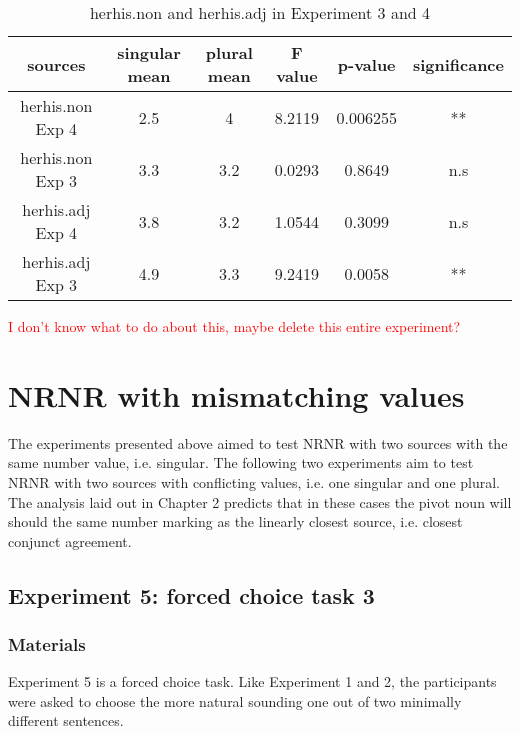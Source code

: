 \documentclass[
  11pt          %
  ,letterpaper  %
  ,center       %
  ,noupper      %
  ]{uconnthesis2}
\begin{document}
\begin{table}[htb!] \small \centering
\resizebox{0.8\textwidth}{!}
{
\begin{tabular}{ | c | c | c | c | c | c |} \hline 
sources			&	singular mean	&	plural mean 	& 	F value		&	p-value		&	significance	\\ \hline
herhis.non	 Exp 4	&	2.5 			&	4			&	8.2119 		&	0.006255		&	**			\\ \hline
herhis.non Exp 3	&	3.3			&	3.2			&	0.0293 		&	0.8649		&	n.s			\\ \hline
herhis.adj	Exp 4	&	3.8 			&	3.2			&	1.0544 		&	0.3099		&	n.s			\\ \hline
herhis.adj	Exp 3	&	4.9			&	3.3			&	9.2419		&	0.0058 		&	**			\\ \hline
\end{tabular}}
\caption{herhis.non and herhis.adj in Experiment 3 and 4} \label{tab:herhisexp3exp4}
\end{table} 

\textcolor{red}{I don't know what to do about this, maybe delete this entire experiment?}



\section{NRNR with mismatching values}

The experiments presented above aimed to test NRNR with two sources with the same number value, i.e. singular. The following two experiments aim to test NRNR with two sources with conflicting values, i.e. one singular and one plural. The analysis laid out in Chapter 2 predicts that in these cases the pivot noun will should the same number marking as the linearly closest source, i.e. closest conjunct agreement. 

\subsection{Experiment 5: forced choice task 3}

\subsubsection{Materials}

Experiment 5 is a forced choice task. Like Experiment 1 and 2, the participants were asked to choose the more natural sounding one out of two minimally different sentences. 
\end{document}
